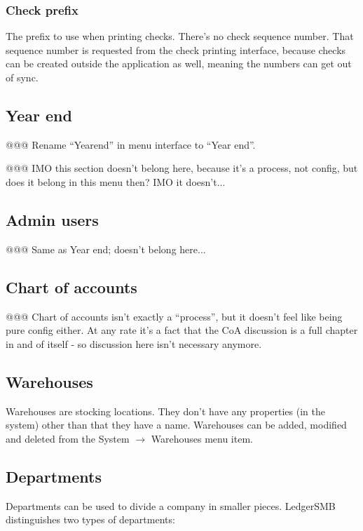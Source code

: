 \documentclass[10pt,A4]{book}
\begin{document}
\subsubsection{Check prefix} The prefix to use when printing checks. There's no check sequence number. That sequence number is requested from the check printing interface, because
checks can be created outside the application as well, meaning the numbers can
get out of sync.

\subsection{Year end}

@@@ Rename ``Yearend'' in menu interface to ``Year end''.


@@@ IMO this section doesn't belong here, because it's a process, not config, but does it belong in this menu then? IMO it doesn't...


\subsection{Admin users}

@@@ Same as Year end; doesn't belong here...

\subsection{Chart of accounts}

@@@ Chart of accounts isn't exactly a ``process'', but it doesn't feel like being pure
config either. At any rate it's a fact that the CoA discussion is a full chapter in and
of itself - so discussion here isn't necessary anymore.

\subsection{Warehouses}

Warehouses are stocking locations. They don't have any properties (in the system)
other than that they have a name. Warehouses can be added, modified and deleted from
the System $\rightarrow$ Warehouses menu item.

\subsection{Departments}

Departments can be used to divide a company in smaller pieces. LedgerSMB distinguishes two
types of departments:
\end{document}
